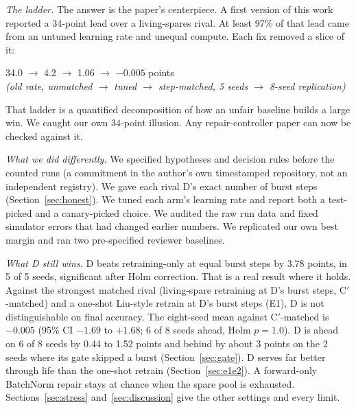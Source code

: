 \documentclass[journal]{IEEEtran}
\begin{document}
\textit{The ladder.}
The answer is the paper's centerpiece.
A first version of this work reported a 34-point lead over a living-spares rival.
At least 97\% of that lead came from an untuned learning rate and unequal compute.
Each fix removed a slice of it:
\begin{center}
34.0 $\rightarrow$ 4.2 $\rightarrow$ 1.06 $\rightarrow$ $-0.005$ points\\
{\footnotesize\emph{(old rate, unmatched $\rightarrow$ tuned $\rightarrow$ step-matched, 5 seeds $\rightarrow$ 8-seed replication)}}
\end{center}
That ladder is a quantified decomposition of how an unfair baseline builds a large win.
We caught our own 34-point illusion.
Any repair-controller paper can now be checked against it.

\textit{What we did differently.}
We specified hypotheses and decision rules before the counted runs (a commitment in the author's own timestamped repository, not an independent registry).
We gave each rival D's exact number of burst steps (Section~\ref{sec:honest}).
We tuned each arm's learning rate and report both a test-picked and a canary-picked choice.
We audited the raw run data and fixed simulator errors that had changed earlier numbers.
We replicated our own best margin and ran two pre-specified reviewer baselines.

\textit{What D still wins.}
D beats retraining-only at equal burst steps by 3.78 points, in 5 of 5 seeds, significant after Holm correction.
That is a real result where it holds.
Against the strongest matched rival (living-spare retraining at D's burst steps, C$'$-matched) and a one-shot Liu-style retrain at D's burst steps (E1), D is not distinguishable on final accuracy.
The eight-seed mean against C$'$-matched is $-0.005$ (95\% CI $-1.69$ to $+1.68$; 6 of 8 seeds ahead, Holm $p=1.0$).
D is ahead on 6 of 8 seeds by 0.44 to 1.52 points and behind by about 3 points on the 2 seeds where its gate skipped a burst (Section~\ref{sec:gate}).
D serves far better through life than the one-shot retrain (Section~\ref{sec:e1e2}).
A forward-only BatchNorm repair stays at chance when the spare pool is exhausted.
Sections~\ref{sec:stress} and~\ref{sec:discussion} give the other settings and every limit.
\end{document}

